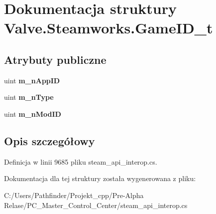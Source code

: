 \hypertarget{struct_valve_1_1_steamworks_1_1_game_i_d__t}{}\section{Dokumentacja struktury Valve.\+Steamworks.\+Game\+I\+D\+\_\+t}
\label{struct_valve_1_1_steamworks_1_1_game_i_d__t}
\subsection*{Atrybuty publiczne}
\begin{DoxyCompactItemize}
\item 
\mbox{\label{struct_valve_1_1_steamworks_1_1_game_i_d__t_a72bbcdbd700319b97b4eb08259d51ea2}} 
uint {\bfseries m\+\_\+n\+App\+ID}
\item 
\mbox{\label{struct_valve_1_1_steamworks_1_1_game_i_d__t_ac27f0791f89bd9ba5d463ccdf848be7d}} 
uint {\bfseries m\+\_\+n\+Type}
\item 
\mbox{\label{struct_valve_1_1_steamworks_1_1_game_i_d__t_a5d7d47a10c8fdb34a57f31ffa1e8c80b}} 
uint {\bfseries m\+\_\+n\+Mod\+ID}
\end{DoxyCompactItemize}


\subsection{Opis szczegółowy}


Definicja w linii 9685 pliku steam\+\_\+api\+\_\+interop.\+cs.



Dokumentacja dla tej struktury została wygenerowana z pliku\+:\begin{DoxyCompactItemize}
\item 
C\+:/\+Users/\+Pathfinder/\+Projekt\+\_\+cpp/\+Pre-\/\+Alpha Relase/\+P\+C\+\_\+\+Master\+\_\+\+Control\+\_\+\+Center/steam\+\_\+api\+\_\+interop.\+cs\end{DoxyCompactItemize}
